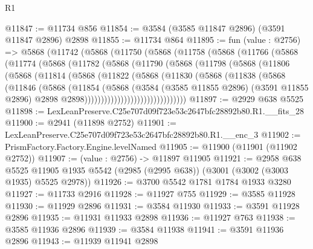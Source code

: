 \begin{lexlean}{R1}
\begin{coremodule}
@11847 := @11734 @856
@11854 := @3584 (@3585 @11847 @2896) (@3591 @11847 @2896) @2898
@11855 := @11734 @864
@11895 := fun (value : @2756) =>
  @5868
    (@11742
      (@5868
        (@11750
          (@5868
            (@11758
              (@5868
                (@11766
                  (@5868
                    (@11774
                      (@5868
                        (@11782
                          (@5868
                            (@11790
                              (@5868
                                (@11798
                                  (@5868
                                    (@11806
                                      (@5868
                                        (@11814
                                          (@5868
                                            (@11822
                                              (@5868
                                                (@11830
                                                  (@5868
                                                    (@11838
                                                      (@5868
                                                        (@11846
                                                          (@5868
                                                            (@11854
                                                              (@5868
                                                                (@3584
                                                                  (@3585 @11855 @2896)
                                                                  (@3591 @11855 @2896)
                                                                  @2898
                                                                  @2898)))))))))))))))))))))))))))))))
@11897 := @2929 @638 @5525
@11898 := LexLeanPreserve.C25e707d09f723e53c2647bfc28892b80.R1.__fits_28
@11900 := @2941 (@11898 @2752)
@11901 := LexLeanPreserve.C25e707d09f723e53c2647bfc28892b80.R1.__enc_3
@11902 := PrismFactory.Factory.Engine.levelNamed
@11905 := @11900 (@11901 (@11902 @2752))
@11907 := (value : @2756) -> @11897 @11905
@11921 := @2958
    @638
    @5525
    @11905
    @1935
    @5542
    (@2985 (@2995 @638))
    (@3001 (@3002 (@3003 @1935) @5525 @2978))
@11926 := @3700 @5542 @1781 @1784 @1933 @3280
@11927 := @11733 @2916
@11928 := @11927 @755
@11929 := @3585 @11928
@11930 := @11929 @2896
@11931 := @3584 @11930
@11933 := @3591 @11928 @2896
@11935 := @11931 @11933 @2898
@11936 := @11927 @763
@11938 := @3585 @11936 @2896
@11939 := @3584 @11938
@11941 := @3591 @11936 @2896
@11943 := @11939 @11941 @2898

\end{coremodule}
\end{lexlean}
